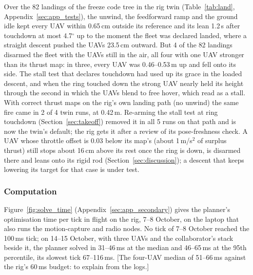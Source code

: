 Over the 82 landings of the freeze code tree in the rig twin (Table~\ref{tab:land}, Appendix~\ref{sec:app_tests}),
the unwind, the feedforward ramp and the ground idle kept every UAV within 0.65\,cm outside its reference and its lean
1.2\,s after touchdown at most 4.7$^\circ$ up to the moment the fleet was declared landed, where a straight descent pushed the UAVs 23.5\,cm outward. But 4 of the
82 landings disarmed the fleet with the UAVs still in the air, all four with one UAV stronger than its thrust map:
in three, every UAV was 0.46--0.53\,m up and fell onto its side. The stall test that declares touchdown had used up
its grace in the loaded descent, and when the ring touched down the strong UAV nearly held its height through the
second in which the UAVs blend to free hover, which read as a stall. With correct thrust maps on the rig's own
landing path (no unwind) the same fire came in 2 of 4 twin runs, at 0.42\,m. Re-arming the stall test at ring
touchdown (Section~\ref{sec:takeoff}) removed it in all 5 runs on that path and is now the twin's default; the rig
gets it after a review of its pose-freshness check. A UAV whose throttle offset is 0.03 below its map's (about 1\,m/s$^2$ of surplus thrust)
still stops about 16\,cm above its rest once the ring is down, is disarmed there and leans onto its rigid rod (Section~\ref{sec:discussion}); a
descent that keeps lowering its target for that case is under test.

\subsubsection{Computation}
\label{sec:res_compute}

Figure~\ref{fig:solve_time} (Appendix~\ref{sec:app_secondary}) gives the planner's optimisation time per tick in flight on the rig, 7--8
October, on the laptop that also runs the motion-capture and radio nodes. No tick of 7--8 October reached the 100\,ms tick; on 14--15
October, with three UAVs and the collaborator's stack beside it, the planner solved in 31--46\,ms at the median and
46--65\,ms at the 95th percentile, its slowest tick 67--116\,ms. [The four-UAV median of 51--66\,ms against the rig's 60\,ms budget: to explain from
the logs.]



